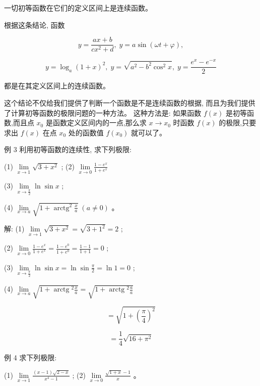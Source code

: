 \documentclass[lang=cn,newtx,12pt,scheme=chinese]{elegantbook}
\begin{document}
\begin{conclusion}
	一切初等函数在它们的定义区间上是连续函数。
\end{conclusion}

根据这条结论, 函数

\[
y = \frac{{ax} + b}{c{x}^{2} + d},\;y = a\sin \left( {{\omega t} + \varphi }\right) ,
\]

\[
y = {\log }_{a}{\left( 1 + x\right) }^{2},\;y = \sqrt{{a}^{2} - {b}^{2}{\cos }^{2}x},\;y = \frac{{e}^{x} - {e}^{-x}}{2}
\]

都是在其定义区间上的连续函数。

这个结论不仅给我们提供了判断一个函数是不是连续函数的根据, 而且为我们提供了计算初等函数的极限问题的一种方法。 这种方法是: 如果函数 \(f\left( x\right)\) 是初等函数,而且点 \({x}_{0}\) 是函数定义区间内的一点,那么求 \(x \rightarrow {x}_{0}\) 时函数 \(f\left( x\right)\) 的极限,只要求出 \(f\left( x\right)\) 在点 \({x}_{0}\) 处的函数值 \(f\left( {x}_{0}\right)\) 就可以了。

例 3 利用初等函数的连续性, 求下列极限:

(1) \(\mathop{\lim }\limits_{{x \rightarrow 1}}\sqrt{3 + {x}^{2}}\) ; (2) \(\mathop{\lim }\limits_{{x \rightarrow 0}}\frac{1 - {e}^{x}}{1 + {e}^{x}}\)

(3) \(\mathop{\lim }\limits_{{x \rightarrow \frac{\pi }{2}}}\ln \sin x\) ;

(4) \(\mathop{\lim }\limits_{{x \rightarrow a}}\sqrt{1 + {\operatorname{arctg}}^{2}\frac{x}{a}}\;\left( {a \neq 0}\right)\) 。

解: (1) \(\mathop{\lim }\limits_{{x \rightarrow 1}}\sqrt{3 + {x}^{2}} = \sqrt{3 + {1}^{2}} = 2\) ;

(2) \(\mathop{\lim }\limits_{{x \rightarrow 0}}\frac{1 - {e}^{x}}{1 + {e}^{x}} = \frac{1 - {e}^{0}}{1 + {e}^{0}} = \frac{1 - 1}{1 + 1} = 0\) ;

(3) \(\mathop{\lim }\limits_{{x \rightarrow \frac{\pi }{2}}}\ln \sin x = \ln \sin \frac{\pi }{2} = \ln 1 = 0\) ;

(4) \(\mathop{\lim }\limits_{{x \rightarrow a}}\sqrt{1 + \operatorname{arctg}{}^{2}\frac{x}{a}} = \sqrt{1 + \operatorname{arctg}{}^{2}\frac{a}{a}}\)

\[
= \sqrt{1 + {\left( \frac{\pi }{4}\right) }^{2}}
\]

\[
= \frac{1}{4}\sqrt{{16} + {\pi }^{2}}
\]

例 4 求下列极限:

(1) \(\mathop{\lim }\limits_{{x \rightarrow 1}}\frac{\left( {x - 1}\right) \sqrt{2 - x}}{{x}^{4} - 1}\) ; (2) \(\mathop{\lim }\limits_{{x \rightarrow 0}}\frac{\sqrt{1 + x} - 1}{x}\) 。
\end{document}
